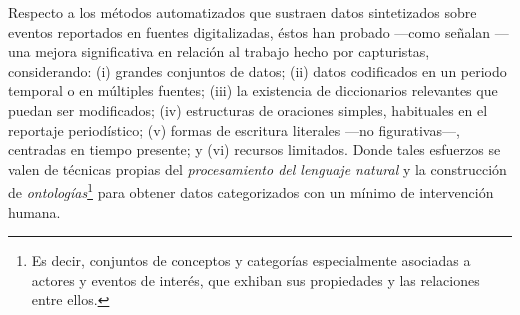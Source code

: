 \documentclass[letterpaper, 11pt]{book}
\theoremstyle{definition}
\theoremstyle{remark}
\begin{document}
Respecto a los métodos automatizados que sustraen datos sintetizados sobre eventos reportados en fuentes digitalizadas, éstos han probado ---como señalan \citet{2013_Schrodt_automatedPolitical}--- una mejora significativa en relación al trabajo hecho por capturistas, considerando: 
(i) grandes conjuntos de datos; 
(ii) datos codificados en un periodo temporal o en múltiples fuentes; 
(iii) la existencia de diccionarios relevantes que puedan ser modificados; 
(iv) estructuras de oraciones simples, habituales en el reportaje periodístico; 
(v) formas de escritura literales ---no figurativas---, centradas en tiempo presente; 
y (vi) recursos limitados. 
Donde tales esfuerzos se valen de técnicas propias del \emph{procesamiento del lenguaje natural} y la construcción de \emph{ontologías}\footnote{
     Es decir, conjuntos de conceptos y categorías especialmente asociadas a actores y eventos de interés, que exhiban sus propiedades y las relaciones entre ellos. 
} para obtener datos categorizados con un mínimo de intervención humana. 
\end{document}

